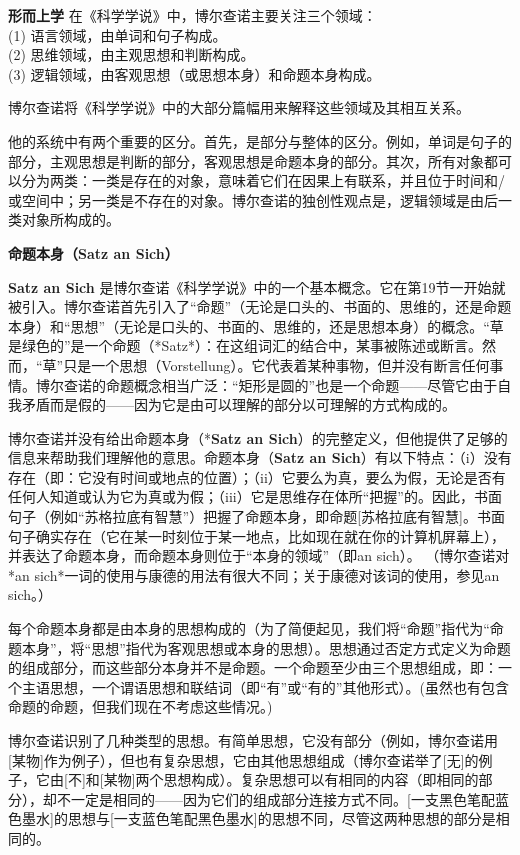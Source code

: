 \textbf{形而上学} 
在《科学学说》中，博尔查诺主要关注三个领域：\\

(1) 语言领域，由单词和句子构成。\\  
(2) 思维领域，由主观思想和判断构成。\\  
(3) 逻辑领域，由客观思想（或思想本身）和命题本身构成。

博尔查诺将《科学学说》中的大部分篇幅用来解释这些领域及其相互关系。

他的系统中有两个重要的区分。首先，是部分与整体的区分。例如，单词是句子的部分，主观思想是判断的部分，客观思想是命题本身的部分。其次，所有对象都可以分为两类：一类是存在的对象，意味着它们在因果上有联系，并且位于时间和/或空间中；另一类是不存在的对象。博尔查诺的独创性观点是，逻辑领域是由后一类对象所构成的。

\textbf{命题本身（Satz an Sich）} 

\textbf{Satz an Sich} 是博尔查诺《科学学说》中的一个基本概念。它在第19节一开始就被引入。博尔查诺首先引入了“命题”（无论是口头的、书面的、思维的，还是命题本身）和“思想”（无论是口头的、书面的、思维的，还是思想本身）的概念。“草是绿色的”是一个命题（*Satz*）：在这组词汇的结合中，某事被陈述或断言。然而，“草”只是一个思想（Vorstellung）。它代表着某种事物，但并没有断言任何事情。博尔查诺的命题概念相当广泛：“矩形是圆的”也是一个命题——尽管它由于自我矛盾而是假的——因为它是由可以理解的部分以可理解的方式构成的。

博尔查诺并没有给出命题本身（*\textbf{Satz an Sich}）的完整定义，但他提供了足够的信息来帮助我们理解他的意思。命题本身（\textbf{Satz an Sich}）有以下特点：（i）没有存在（即：它没有时间或地点的位置）；（ii）它要么为真，要么为假，无论是否有任何人知道或认为它为真或为假；（iii）它是思维存在体所“把握”的。因此，书面句子（例如“苏格拉底有智慧”）把握了命题本身，即命题[苏格拉底有智慧]。书面句子确实存在（它在某一时刻位于某一地点，比如现在就在你的计算机屏幕上），并表达了命题本身，而命题本身则位于“本身的领域”（即an sich）。  
（博尔查诺对*an sich*一词的使用与康德的用法有很大不同；关于康德对该词的使用，参见an sich。）

每个命题本身都是由本身的思想构成的（为了简便起见，我们将“命题”指代为“命题本身”，将“思想”指代为客观思想或本身的思想）。思想通过否定方式定义为命题的组成部分，而这些部分本身并不是命题。一个命题至少由三个思想组成，即：一个主语思想，一个谓语思想和联结词（即“有”或“有的”其他形式）。(虽然也有包含命题的命题，但我们现在不考虑这些情况。)

博尔查诺识别了几种类型的思想。有简单思想，它没有部分（例如，博尔查诺用[某物]作为例子），但也有复杂思想，它由其他思想组成（博尔查诺举了[无]的例子，它由[不]和[某物]两个思想构成）。复杂思想可以有相同的内容（即相同的部分），却不一定是相同的——因为它们的组成部分连接方式不同。[一支黑色笔配蓝色墨水]的思想与[一支蓝色笔配黑色墨水]的思想不同，尽管这两种思想的部分是相同的。

